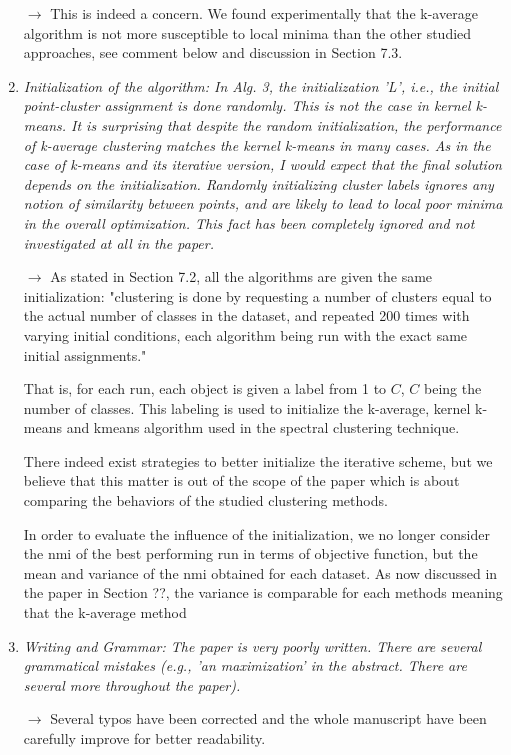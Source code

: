 \documentclass[10pt]{article}
\begin{document}
\begin{enumerate}
$\rightarrow$ This is indeed a concern. We found experimentally that the k-average algorithm is not more susceptible to local minima than the other studied approaches, see comment below and discussion in Section 7.3.

\item \emph{Initialization of the algorithm:
In Alg. 3, the initialization 'L', i.e., the initial point-cluster assignment is done randomly. This is not the case in kernel k-means. It is surprising that despite the random initialization, the performance of k-average clustering matches the kernel k-means in many cases. As in the case of k-means and its iterative version, I would expect that the final solution depends on the initialization. Randomly initializing cluster labels ignores any notion of similarity between points, and are likely to lead to local poor minima in the overall optimization. This fact has been completely ignored and not investigated at all in the paper.}

$\rightarrow$ As stated in Section 7.2, all the algorithms are given the same initialization: "clustering is done by requesting a number of clusters equal to the actual number of classes in the dataset, and repeated 200 times with varying initial conditions, each algorithm being run with the exact same initial assignments."

That is, for each run, each object is given a label from 1 to $C$, $C$ being the number of classes. This labeling is used to initialize the k-average, kernel k-means and kmeans algorithm used in the spectral clustering technique.

There indeed exist strategies to better initialize the iterative scheme, but we believe that this matter is out of the scope of the paper which is about comparing the behaviors of the studied clustering methods.

In order to evaluate the influence of the initialization, we no longer consider the nmi of the best performing run in terms of objective function, but the mean and variance of the nmi obtained for each dataset. As now discussed in the paper in Section ??, the variance is comparable for each methods meaning that the k-average method

\item \emph{Writing and Grammar: The paper is very poorly written. There are several grammatical mistakes (e.g., 'an maximization' in the abstract. There are several more throughout the paper).}

$\rightarrow$ Several typos have been corrected and the whole manuscript have been carefully improve for better readability.


\end{enumerate}
\end{document}
